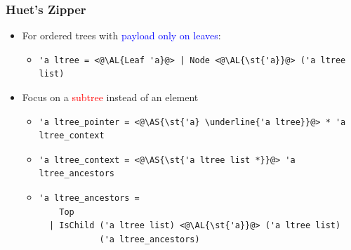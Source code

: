 \begin{frame}[fragile]
\frametitle{Huet's Zipper}

\newcommand{\AS}[1]{\textcolor{red}{#1}}
\newcommand{\AL}[1]{\textcolor{blue}{#1}}

\begin{itemize}
\item For ordered trees with \AL{payload only on leaves}:

\begin{itemize}
\item
\begin{lstlisting}
'a ltree = <@\AL{Leaf 'a}@> | Node <@\AL{\st{'a}}@> ('a ltree list)
\end{lstlisting}
\end{itemize}

\item Focus on a \AS{subtree} instead of an element

\begin{itemize}
\item
\begin{lstlisting}
'a ltree_pointer = <@\AS{\st{'a} \underline{'a ltree}}@> * 'a ltree_context
\end{lstlisting}

\item 
\begin{lstlisting}
'a ltree_context = <@\AS{\st{'a ltree list *}}@> 'a ltree_ancestors
\end{lstlisting}

\item 
\begin{lstlisting}
'a ltree_ancestors =
    Top
  | IsChild ('a ltree list) <@\AL{\st{'a}}@> ('a ltree list)
            ('a ltree_ancestors)
\end{lstlisting}

\end{itemize} 

\end{itemize}
\end{frame}

